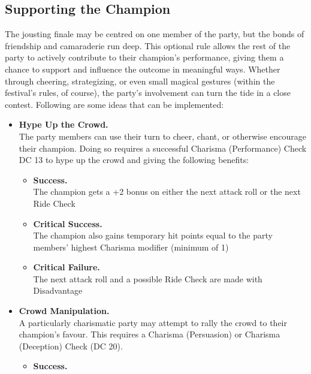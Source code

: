 \subsection*{Supporting the Champion}
{\entryfont The jousting finale may be centred on one member of the party, but the bonds of friendship and camaraderie run deep. This optional rule allows the rest of the party to actively contribute to their champion's performance, giving them a chance to support and influence the outcome in meaningful ways. Whether through cheering, strategizing, or even small magical gestures (within the festival's rules, of course), the party's involvement can turn the tide in a close contest. Following are some ideas that can be implemented:
\begin{itemize}
	\renewcommand\labelitemi{\textbf{\textbullet}}
	\item \textbf{Hype Up the Crowd.}\\
	The party members can use their turn to cheer, chant, or otherwise encourage their champion. Doing so requires a successful Charisma (Performance) Check DC 13 to hype up the crowd and giving the following benefits:
	\begin{itemize}
		\renewcommand\labelitemii{\textbf{\textbullet}}
		\item \textbf{Success.}\\
		The champion gets a +2 bonus on either the next attack roll or the next Ride Check
		\item \textbf{Critical Success.}\\
		The champion also gains temporary hit points equal to the party members' highest Charisma modifier (minimum of 1)
		\item \textbf{Critical Failure.}\\
		The next attack roll and a possible Ride Check are made with Disadvantage
	\end{itemize}
\end{itemize}
\vfill\eject
\begin{itemize}
	\renewcommand\labelitemi{\textbf{\textbullet}}
	\item \textbf{Crowd Manipulation.}\\
	A particularly charismatic party may attempt to rally the crowd to their champion's favour. This requires a Charisma (Persuasion) or Charisma (Deception) Check (DC 20).
	\begin{itemize}
		\renewcommand\labelitemii{\textbf{\textbullet}}
		\item \textbf{Success.}\\

\end{itemize}
\end{itemize}}
